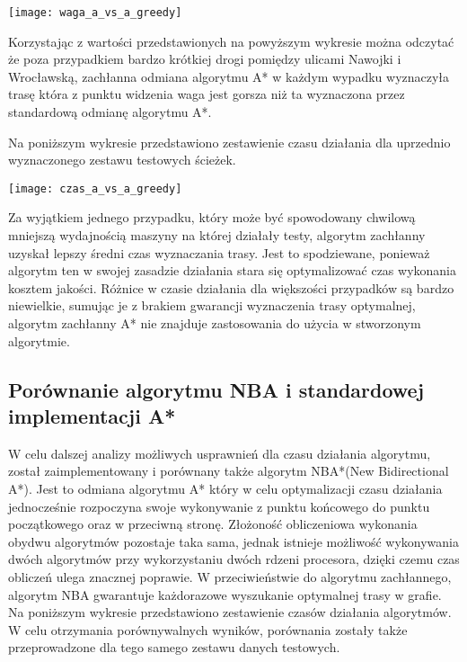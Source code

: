 \begin{center}
\texttt{[image: waga\_a\_vs\_a\_greedy]}
\end{center}

Korzystając z wartości przedstawionych na powyższym wykresie można odczytać że poza przypadkiem bardzo krótkiej drogi pomiędzy ulicami Nawojki i Wrocławską, zachłanna odmiana algorytmu A* w każdym wypadku wyznaczyła trasę która z punktu widzenia waga jest gorsza niż ta wyznaczona przez standardową odmianę algorytmu A*.

Na poniższym wykresie przedstawiono zestawienie czasu działania dla uprzednio wyznaczonego zestawu testowych ścieżek.

\begin{center}
\texttt{[image: czas\_a\_vs\_a\_greedy]}
\end{center}

Za wyjątkiem jednego przypadku, który może być spowodowany chwilową mniejszą wydajnością maszyny na której działały testy, algorytm zachłanny uzyskał lepszy średni czas wyznaczania trasy. Jest to spodziewane, ponieważ algorytm ten w swojej zasadzie działania stara się optymalizować czas wykonania kosztem jakości. Różnice w czasie działania dla większości przypadków są bardzo niewielkie, sumując je z brakiem gwarancji wyznaczenia trasy optymalnej, algorytm zachłanny A* nie znajduje zastosowania do użycia w stworzonym algorytmie.

\subsection{Porównanie algorytmu NBA i standardowej implementacji A*}

W celu dalszej analizy możliwych usprawnień dla czasu działania algorytmu, został zaimplementowany i porównany także algorytm NBA*(New Bidirectional A*). Jest to odmiana algorytmu A* który w celu optymalizacji czasu działania jednocześnie rozpoczyna swoje wykonywanie z punktu końcowego do punktu początkowego oraz w przeciwną stronę. Złożoność obliczeniowa wykonania obydwu algorytmów pozostaje taka sama, jednak istnieje możliwość wykonywania dwóch algorytmów przy wykorzystaniu dwóch rdzeni procesora, dzięki czemu czas obliczeń ulega znacznej poprawie. W przeciwieństwie do algorytmu zachłannego, algorytm NBA gwarantuje każdorazowe wyszukanie optymalnej trasy w grafie.
Na poniższym wykresie przedstawiono zestawienie czasów działania algorytmów. W celu otrzymania porównywalnych wyników, porównania zostały także przeprowadzone dla tego samego zestawu danych testowych.

